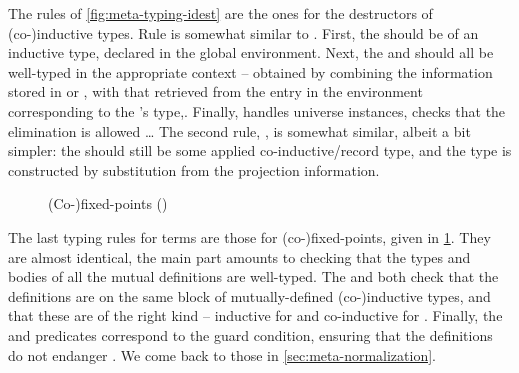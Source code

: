 \begin{figure*}
  \ContinuedFloat
  \caption{(Co-)inductive destructors ()}
  \label{fig:meta-typing-idest}
\end{figure*}

The rules of \cref{fig:meta-typing-idest} are the ones for the destructors of (co-)inductive
types. Rule  is somewhat similar to . First,
the  should be of an inductive type, declared in the global environment.
Next, the  and  should all be well-typed
in the appropriate context – obtained by combining the information stored in
 or , with that retrieved from the entry in the environment corresponding to
the 's type,.
Finally,  handles universe instances, checks
that the elimination is allowed%
…
The second rule, , is somewhat similar, albeit a bit simpler: the 
should still be some applied co-inductive/record type, and the type is constructed by
substitution from the projection information.

\begin{figure}
  \ContinuedFloat
  \caption{(Co-)fixed-points ()}
  \label{fig:meta-typing-fix}
\end{figure}

The last typing rules for terms are those for (co-)fixed-points,
given in \cref{fig:meta-typing-fix}. They are almost identical,
the main part amounts to checking that the types and bodies of all
the mutual definitions are well-typed.
The  and  both check that the definitions are on
the same block of mutually-defined (co-)inductive types, and that these are of the right kind –
inductive for  and co-inductive for .
Finally, the  and  predicates correspond to the guard condition,
ensuring that the definitions do not endanger . We come back to those in
\cref{sec:meta-normalization}.

